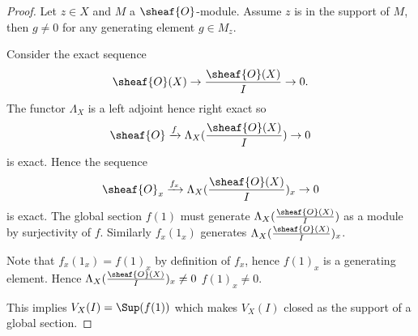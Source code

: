 
\begin{proof}
Let $z\in X$ and $M$ a $\sheaf{O}$-module. Assume $z$ is in the support of $M$, then $g\neq 0$ for any generating element $g\in M_z$. 

Consider the exact sequence 
\[\sheaf{O}(X)\rightarrow \frac{\sheaf{O}(X)}{I} \rightarrow 0.\]
The functor $\Lambda_X$ is a left adjoint hence right exact so 
\[\sheaf{O} \xrightarrow{f} \Lambda_X(\frac{\sheaf{O}(X)}{I}) \rightarrow 0\]
is exact.
Hence the sequence
\[\sheaf{O}_x \xrightarrow{f_x} \Lambda_X(\frac{\sheaf{O}(X)}{I})_x \rightarrow 0\]
is exact. 
The global section $f(1)$ must generate $\Lambda_X(\frac{\sheaf{O}(X)}{I})$ as a module by surjectivity of $f$.
Similarly $f_x(1_x)$ generates $\Lambda_X(\frac{\sheaf{O}(X)}{I})_x$.

Note that $f_x(1_x) = f(1)_x$ by definition of $f_x$, hence $f(1)_x$ is a generating element.
Hence $\Lambda_X(\frac{\sheaf{O}(X)}{I})_x \neq 0$ \iff $f(1)_x \neq 0$. 

This implies $V_X(I) = \Sup(f(1))$ which makes $V_X(I)$ closed as the support of a global section.
\end{proof}
